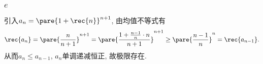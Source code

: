 \documentclass{ctexart}
\begin{document}
\subsubsection{\texorpdfstring{$e$}{e}} %
\label{ssub:e}

引入$\displaystyle a_n = \pare{1+\rec{n}}^{n+1}$, 由均值不等式有
\[ \rec{a_n} = \pare{\frac{n}{n+1}}^{n+1} = \pare{\frac{1+\frac{n-1}{n}\cdot n}{n+1}}^{n+1} \ge \pare{\frac{n-1}{n}}^n = \rec{a_{n-1}}. \]
从而$a_n\le a_{n-1}$, $a_n$单调递减恒正, 故极限存在.



\end{document}
